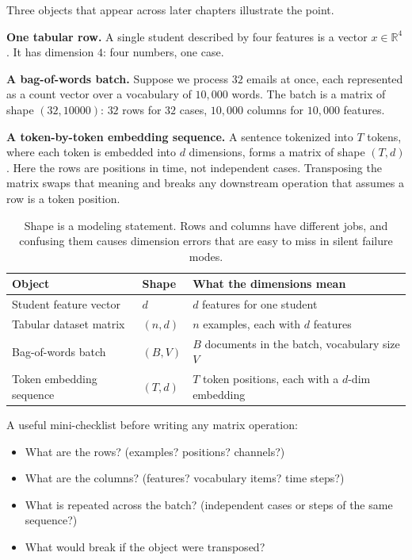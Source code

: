 Three objects that appear across later chapters illustrate the point.

\textbf{One tabular row.} A single student described by four features is a vector $x \in \mathbb{R}^4$. It has dimension $4$: four numbers, one case.

\textbf{A bag-of-words batch.} Suppose we process $32$ emails at once, each represented as a count vector over a vocabulary of $10{,}000$ words. The batch is a matrix of shape $(32, 10000)$: $32$ rows for $32$ cases, $10{,}000$ columns for $10{,}000$ features.

\textbf{A token-by-token embedding sequence.} A sentence tokenized into $T$ tokens, where each token is embedded into $d$ dimensions, forms a matrix of shape $(T, d)$. Here the rows are positions in time, not independent cases. Transposing the matrix swaps that meaning and breaks any downstream operation that assumes a row is a token position.

\begin{table}[t]
\centering
\small
\setlength{\tabcolsep}{4pt}
\begin{tabular}{p{2.72cm}p{2.38cm}p{4.85cm}}
\toprule
Object & Shape & What the dimensions mean \\
\midrule
Student feature vector & $d$ & $d$ features for one student \\
Tabular dataset matrix & $(n, d)$ & $n$ examples, each with $d$ features \\
Bag-of-words batch & $(B, V)$ & $B$ documents in the batch, vocabulary size $V$ \\
Token embedding sequence & $(T, d)$ & $T$ token positions, each with a $d$-dim embedding \\
\bottomrule
\end{tabular}
\caption{Shape is a modeling statement. Rows and columns have different jobs, and confusing them causes dimension errors that are easy to miss in silent failure modes.}
\label{tab:shape-meanings}
\end{table}

A useful mini-checklist before writing any matrix operation:
\begin{itemize}[leftmargin=*]
\item What are the rows? (examples? positions? channels?)
\item What are the columns? (features? vocabulary items? time steps?)
\item What is repeated across the batch? (independent cases or steps of the same sequence?)
\item What would break if the object were transposed?
\end{itemize}

